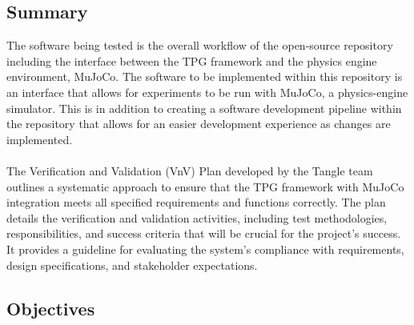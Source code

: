 \documentclass[12pt, titlepage]{article}
\begin{document}
\subsection{Summary}


The software being tested is the overall workflow of the open-source repository including the interface between the TPG framework and the physics engine environment, MuJoCo.
The software to be implemented within this repository is an interface that allows for experiments to be run with MuJoCo, a physics-engine simulator. This is in addition to creating a software development pipeline within the repository that allows for an easier development experience as changes are implemented. \\\\

The Verification and Validation (VnV) Plan developed by the Tangle team outlines a systematic approach to ensure that the TPG framework with MuJoCo integration meets all specified requirements and functions correctly. The plan details the verification and validation activities, including test methodologies, responsibilities, and success criteria that will be crucial for the project's success. It provides a guideline for evaluating the system's compliance with requirements, design specifications, and stakeholder expectations.


\subsection{Objectives}



\end{document}
